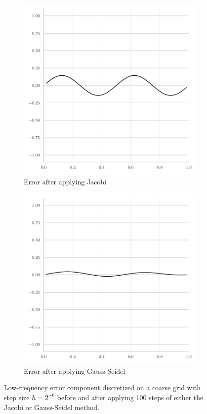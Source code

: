 \begin{figure}
\begin{subfigure}[b]{0.32\textwidth}
	\includegraphics[width=\textwidth]{figures/final_error_jacobi_4pi_coarse.pdf}
	\caption{Error after applying Jacobi}
\end{subfigure}
	\hfill
	\begin{subfigure}[b]{0.32\textwidth}
		\centering
		\includegraphics[width=\textwidth]{figures/final_error_gauss_seidel_4pi_coarse.pdf}
		\caption{Error after applying Gauss-Seidel}
	\end{subfigure}
	\caption{Low-frequency error component discretized on a coarse grid with step size $h = 2^{-6}$ before and after applying 100 steps of either the Jacobi or Gauss-Seidel method.}
	\label{fig:low-frequency-error-component-coarse}
\end{figure}

